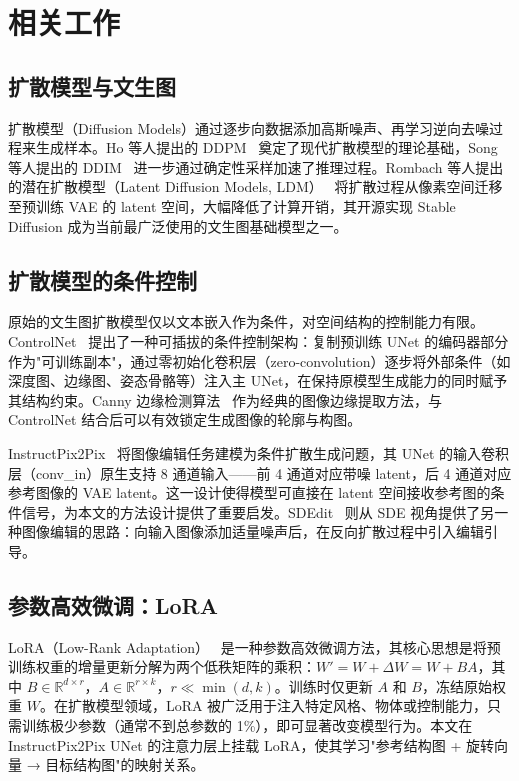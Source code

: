 \chapter{相关工作}

\section{扩散模型与文生图}

扩散模型（Diffusion Models）通过逐步向数据添加高斯噪声、再学习逆向去噪过程来生成样本。Ho 等人提出的 DDPM~\cite{ho2020ddpm} 奠定了现代扩散模型的理论基础，Song 等人提出的 DDIM~\cite{song2021ddim} 进一步通过确定性采样加速了推理过程。Rombach 等人提出的潜在扩散模型（Latent Diffusion Models, LDM）~\cite{rombach2022latentdiffusion} 将扩散过程从像素空间迁移至预训练 VAE 的 latent 空间，大幅降低了计算开销，其开源实现 Stable Diffusion 成为当前最广泛使用的文生图基础模型之一。

\section{扩散模型的条件控制}

原始的文生图扩散模型仅以文本嵌入作为条件，对空间结构的控制能力有限。ControlNet~\cite{zhang2023controlnet} 提出了一种可插拔的条件控制架构：复制预训练 UNet 的编码器部分作为"可训练副本"，通过零初始化卷积层（zero-convolution）逐步将外部条件（如深度图、边缘图、姿态骨骼等）注入主 UNet，在保持原模型生成能力的同时赋予其结构约束。Canny 边缘检测算法~\cite{canny1986edge} 作为经典的图像边缘提取方法，与 ControlNet 结合后可以有效锁定生成图像的轮廓与构图。

InstructPix2Pix~\cite{brooks2023instructpix2pix} 将图像编辑任务建模为条件扩散生成问题，其 UNet 的输入卷积层（conv\_in）原生支持 8 通道输入——前 4 通道对应带噪 latent，后 4 通道对应参考图像的 VAE latent。这一设计使得模型可直接在 latent 空间接收参考图的条件信号，为本文的方法设计提供了重要启发。SDEdit~\cite{meng2022sdedit} 则从 SDE 视角提供了另一种图像编辑的思路：向输入图像添加适量噪声后，在反向扩散过程中引入编辑引导。

\section{参数高效微调：LoRA}

LoRA（Low-Rank Adaptation）~\cite{hu2022lora} 是一种参数高效微调方法，其核心思想是将预训练权重的增量更新分解为两个低秩矩阵的乘积：$W' = W + \Delta W = W + BA$，其中 $B \in \mathbb{R}^{d \times r}$，$A \in \mathbb{R}^{r \times k}$，$r \ll \min(d, k)$。训练时仅更新 $A$ 和 $B$，冻结原始权重 $W$。在扩散模型领域，LoRA 被广泛用于注入特定风格、物体或控制能力，只需训练极少参数（通常不到总参数的 1\%），即可显著改变模型行为。本文在 InstructPix2Pix UNet 的注意力层上挂载 LoRA，使其学习"参考结构图 + 旋转向量 → 目标结构图"的映射关系。

